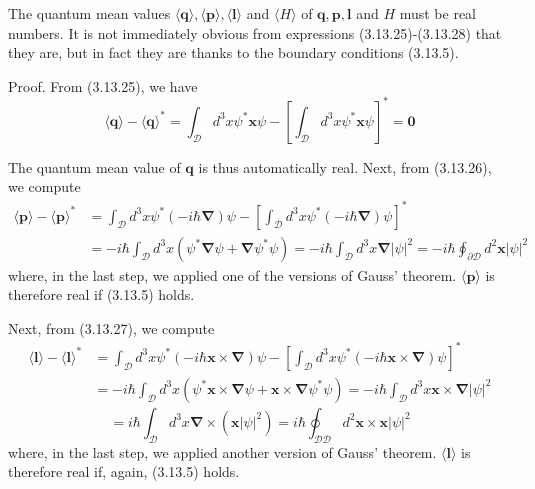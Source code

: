 \documentclass{article}
\begin{document}
The quantum mean values $\langle\boldsymbol{q}\rangle,\langle\boldsymbol{p}\rangle,\langle\boldsymbol{l}\rangle$ and $\langle H\rangle$ of $\boldsymbol{q}, \boldsymbol{p}, \boldsymbol{l}$ and $H$ must be real numbers. It is not immediately obvious from expressions (3.13.25)-(3.13.28) that they are, but in fact they are thanks to the boundary conditions (3.13.5).

Proof. From (3.13.25), we have
$$
\begin{equation*}
\langle\boldsymbol{q}\rangle-\langle\boldsymbol{q}\rangle^{*}=\int_{\mathcal{D}} d^{3} x \psi^{*} \boldsymbol{x} \psi-\left[\int_{\mathcal{D}} d^{3} x \psi^{*} \boldsymbol{x} \psi\right]^{*}=\mathbf{0} \tag{3.13.29}
\end{equation*}
$$

The quantum mean value of $\boldsymbol{q}$ is thus automatically real.
Next, from (3.13.26), we compute
$$
\begin{align*}
\langle\boldsymbol{p}\rangle-\langle\boldsymbol{p}\rangle^{*} & =\int_{\mathcal{D}} d^{3} x \psi^{*}(-i \hbar \boldsymbol{\nabla}) \psi-\left[\int_{\mathcal{D}} d^{3} x \psi^{*}(-i \hbar \boldsymbol{\nabla}) \psi\right]^{*}  \tag{3.13.30}\\
& =-i \hbar \int_{\mathcal{D}} d^{3} x\left(\psi^{*} \boldsymbol{\nabla} \psi+\boldsymbol{\nabla} \psi^{*} \psi\right)=-i \hbar \int_{\mathcal{D}} d^{3} x \boldsymbol{\nabla}|\psi|^{2}=-i \hbar \oint_{\partial \mathcal{D}} d^{2} \boldsymbol{x}|\psi|^{2}
\end{align*}
$$
where, in the last step, we applied one of the versions of Gauss' theorem. $\langle\boldsymbol{p}\rangle$ is therefore real if (3.13.5) holds.

Next, from (3.13.27), we compute
$$
\begin{align*}
\langle\boldsymbol{l}\rangle-\langle\boldsymbol{l}\rangle^{*} & =\int_{\mathcal{D}} d^{3} x \psi^{*}(-i \hbar \boldsymbol{x} \times \boldsymbol{\nabla}) \psi-\left[\int_{\mathcal{D}} d^{3} x \psi^{*}(-i \hbar \boldsymbol{x} \times \boldsymbol{\nabla}) \psi\right]^{*}  \tag{3.13.31}\\
& =-i \hbar \int_{\mathcal{D}} d^{3} x\left(\psi^{*} \boldsymbol{x} \times \boldsymbol{\nabla} \psi+\boldsymbol{x} \times \boldsymbol{\nabla} \psi^{*} \psi\right)=-i \hbar \int_{\mathcal{D}} d^{3} x \boldsymbol{x} \times \boldsymbol{\nabla}|\psi|^{2}
\end{align*}
$$
$$
=i \hbar \int_{\mathcal{D}} d^{3} x \boldsymbol{\nabla} \times\left(\boldsymbol{x}|\psi|^{2}\right)=i \hbar \oint_{\mathcal{D} \mathcal{D}} d^{2} \boldsymbol{x} \times \boldsymbol{x}|\psi|^{2}
$$
where, in the last step, we applied another version of Gauss' theorem. $\langle\boldsymbol{l}\rangle$ is therefore real if, again, (3.13.5) holds.
\end{document}
